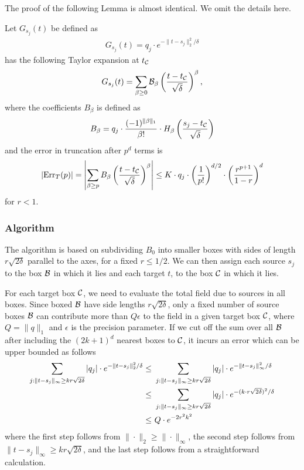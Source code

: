 The proof of the following Lemma is almost identical. We omit the details here.
\begin{lemma}\label{lem:fast_gaussian_lemma_4}
Let $G_{s_j} (t)$ be defined as
\begin{align*}
G_{s_j}(t) = q_j \cdot e^{- \| t - s_j \|_2^2 / \delta}
\end{align*}
has the following Taylor expansion at $t_{\cal C}$
\begin{align*}
G_{s_j}(t) = \sum_{\beta \geq 0} {\cal B}_{\beta} \left( \frac{ t - t_{\cal C} }{ \sqrt{\delta} } \right)^{\beta},
\end{align*}
where the coefficients $B_{\beta}$ is defined as
\begin{align*}
B_{\beta} = q_j \cdot \frac{ (-1)^{ \| \beta\|_1 } }{ \beta ! } \cdot H_{\beta} \left( \frac{ s_j - t_{\cal C} }{ \sqrt{\delta} } \right)
\end{align*}
and the error in truncation after $p^d$ terms is
\begin{align*}
| \mathrm{Err}_T(p) | = \left| \sum_{\beta \geq p} B_{\beta} \left( \frac{t - t_{\cal C}}{ \sqrt{\delta}}  \right)^{\beta} \right| \leq K \cdot q_j \cdot \left( \frac{1}{p!} \right)^{d/2} \cdot \left( \frac{ r^{p+1} }{ 1 -r } \right)^d
\end{align*}
for $r < 1$.
\end{lemma}

\subsubsection{Algorithm}

The algorithm is based on subdividing $B_0$ into smaller boxes with sides of length $r \sqrt{2\delta}$ parallel to the axes, for a fixed $r \leq 1/2$. We can then assign each source $s_j$ to the box ${\cal B}$ in which it lies and each target $t$, to the box ${\cal C}$ in which it lies. 

For each target box ${\cal C}$, we need to evaluate the total field due to sources in all boxes. Since boxed ${\cal B}$ have side lengths $r \sqrt{2\delta}$, only a fixed number of source boxes ${\cal B}$ can contribute more than $Q \epsilon$ to the field in a given target box ${\cal C}$, where $Q = \| q\|_1$ and $\epsilon$ is the precision parameter. If we cut off the sum over all ${\cal B}$ after including the $(2k+1)^d$ nearest boxes to ${\cal C}$, it incurs an error which can be upper bounded as follows 
\begin{align}\label{eq:box_error}
\sum_{j : \| t - s_j \|_{\infty} \geq k r \sqrt{2\delta} } |q_j| \cdot e^{-\| t - s_j \|_2^2 / \delta} 
\leq & ~ \sum_{j : \| t - s_j \|_{\infty} \geq k r \sqrt{2\delta} } |q_j| \cdot e^{-\| t - s_j \|_{\infty}^2 / \delta} \notag\\
\leq & ~  \sum_{j : \| t - s_j \|_{\infty} \geq k r \sqrt{2\delta}} |q_j| \cdot e^{ - ( k \cdot r \sqrt{2\delta} )^2 / \delta } \notag \\
\leq & ~ Q \cdot e^{ - 2r^2 k^2}
\end{align}
where the first step follows from $\| \cdot \|_2 \geq \| \cdot \|_{\infty}$, the second step follows from $\| t - s_j\|_{\infty} \geq k r \sqrt{2\delta}$, and the last step follows from a straightforward calculation.

